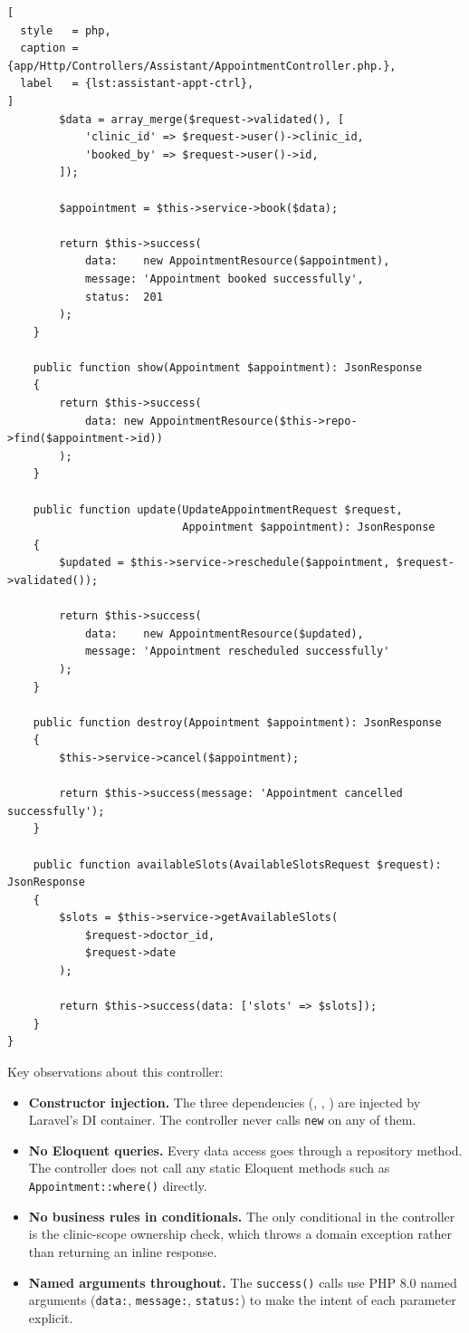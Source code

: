\begin{lstlisting}[
  style   = php,
  caption = {app/Http/Controllers/Assistant/AppointmentController.php.},
  label   = {lst:assistant-appt-ctrl},
]
        $data = array_merge($request->validated(), [
            'clinic_id' => $request->user()->clinic_id,
            'booked_by' => $request->user()->id,
        ]);

        $appointment = $this->service->book($data);

        return $this->success(
            data:    new AppointmentResource($appointment),
            message: 'Appointment booked successfully',
            status:  201
        );
    }

    public function show(Appointment $appointment): JsonResponse
    {
        return $this->success(
            data: new AppointmentResource($this->repo->find($appointment->id))
        );
    }

    public function update(UpdateAppointmentRequest $request,
                           Appointment $appointment): JsonResponse
    {
        $updated = $this->service->reschedule($appointment, $request->validated());

        return $this->success(
            data:    new AppointmentResource($updated),
            message: 'Appointment rescheduled successfully'
        );
    }

    public function destroy(Appointment $appointment): JsonResponse
    {
        $this->service->cancel($appointment);

        return $this->success(message: 'Appointment cancelled successfully');
    }

    public function availableSlots(AvailableSlotsRequest $request): JsonResponse
    {
        $slots = $this->service->getAvailableSlots(
            $request->doctor_id,
            $request->date
        );

        return $this->success(data: ['slots' => $slots]);
    }
}
\end{lstlisting}

Key observations about this controller:

\begin{itemize}
  \item \textbf{Constructor injection.} The three dependencies
    (, ,
    ) are injected by Laravel's DI container.
    The controller never calls \texttt{new} on any of them.
  \item \textbf{No Eloquent queries.} Every data access goes through a
    repository method. The controller does not call any static Eloquent
    methods such as \texttt{Appointment::where()} directly.
  \item \textbf{No business rules in conditionals.} The only conditional
    in the controller is the clinic-scope ownership check, which throws a
    domain exception rather than returning an inline response.
  \item \textbf{Named arguments throughout.} The \texttt{success()} calls
    use PHP 8.0 named arguments (\texttt{data:}, \texttt{message:},
    \texttt{status:}) to make the intent of each parameter explicit.
\end{itemize}

